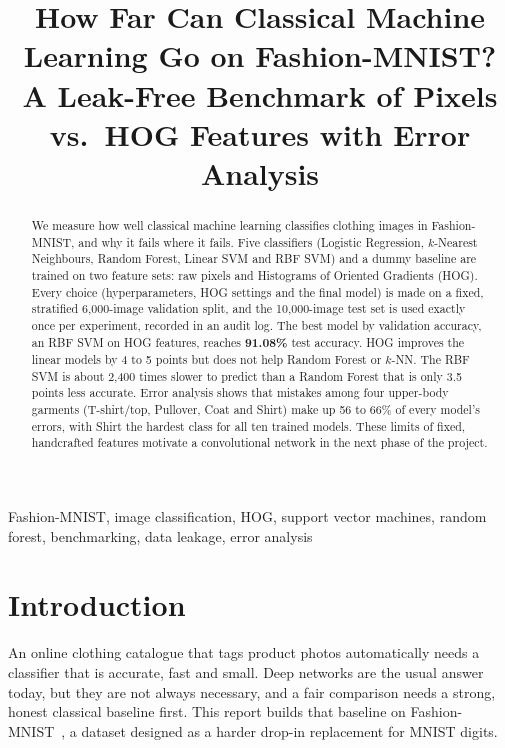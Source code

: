 \documentclass[conference]{IEEEtran}
\begin{document}
\title{How Far Can Classical Machine Learning Go on Fashion-MNIST?\\
\large A Leak-Free Benchmark of Pixels vs.\ HOG Features with Error Analysis}

\author{
\and
{}
\and
{}
\and
{}
\and
{}
\and
{}
}

\maketitle

\begin{abstract}
We measure how well classical machine learning classifies clothing images in Fashion-MNIST, and why it fails where it
fails. Five classifiers (Logistic Regression, $k$-Nearest Neighbours, Random Forest, Linear SVM and RBF SVM) and a dummy
baseline are trained on two feature sets: raw pixels and Histograms of Oriented Gradients (HOG). Every choice
(hyperparameters, HOG settings and the final model) is made on a fixed, stratified 6,000-image validation split, and the
10,000-image test set is used exactly once per experiment, recorded in an audit log. The best model by validation
accuracy, an RBF SVM on HOG features, reaches \textbf{91.08\%} test accuracy. HOG improves the linear models by 4 to 5
points but does not help Random Forest or $k$-NN. The RBF SVM is about 2,400 times slower to predict than a Random Forest
that is only 3.5 points less accurate. Error analysis shows that mistakes among four upper-body garments (T-shirt/top,
Pullover, Coat and Shirt) make up 56 to 66\% of every model's errors, with Shirt the hardest class for all ten trained
models. These limits of fixed, handcrafted features motivate a convolutional network in the next phase of the project.
\end{abstract}

\begin{IEEEkeywords}
Fashion-MNIST, image classification, HOG, support vector machines, random forest, benchmarking, data leakage,
error analysis
\end{IEEEkeywords}

\section{Introduction}
An online clothing catalogue that tags product photos automatically needs a classifier that is accurate, fast and small.
Deep networks are the usual answer today, but they are not always necessary, and a fair comparison needs a strong,
honest classical baseline first. This report builds that baseline on Fashion-MNIST~\cite{xiao2017fashion}, a dataset
designed as a harder drop-in replacement for MNIST digits.
\end{document}
